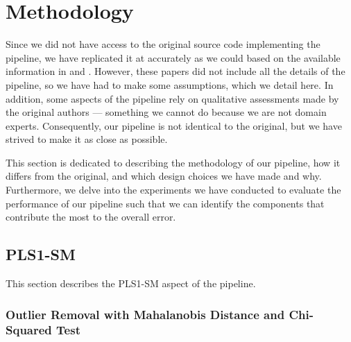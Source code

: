 \section{Methodology}\label{sec:methodology}
Since we did not have access to the original source code implementing the pipeline, we have replicated it at accurately as we could based on the available information in \citeauthor{andersonImprovedAccuracyQuantitative2017} and \citeauthor{cleggRecalibrationMarsScience2017}.
However, these papers did not include all the details of the pipeline, so we have had to make some assumptions, which we detail here.
In addition, some aspects of the pipeline rely on qualitative assessments made by the original authors --- something we cannot do because we are not domain experts.
Consequently, our pipeline is not identical to the original, but we have strived to make it as close as possible.

This section is dedicated to describing the methodology of our pipeline, how it differs from the original, and which design choices we have made and why.
Furthermore, we delve into the experiments we have conducted to evaluate the performance of our pipeline such that we can identify the components that contribute the most to the overall error.

\subsection{PLS1-SM}
This section describes the PLS1-SM aspect of the pipeline.

\subsubsection{Outlier Removal with Mahalanobis Distance and Chi-Squared Test}

